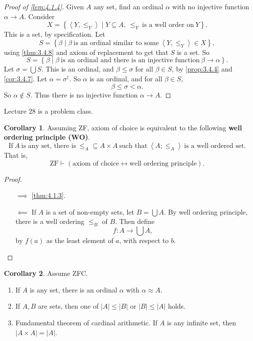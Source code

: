 \documentclass{article}
\newcommand{\rb}[1]{\left( #1 \right)}
\newcommand{\cb}[1]{\left\{ #1 \right\}}
\newcommand{\ab}[1]{\left\langle #1 \right\rangle}
\newcommand{\abs}[1]{\left\lvert #1 \right\rvert}
\newcommand{\iffb}[2]{\rb{#1 \leftrightarrow #2}}
\theoremstyle{definition}\newtheorem{definition}{Definition}[subsection]
\theoremstyle{definition}\newtheorem{remark1}[definition]{Remark}
\theoremstyle{definition}\newtheorem{example1}[definition]{Example}
\theoremstyle{definition}\newtheorem*{remark2}{Remark}
\theoremstyle{definition}\newtheorem*{example2}{Example}
\theoremstyle{definition}\newtheorem*{note}{Note}
\theoremstyle{definition}\newtheorem*{notation}{Notation}
\newtheorem{corollary}[definition]{Corollary}
\begin{document}
\begin{proof}[Proof of \ref{lem:4.1.4}]
Given $ A $ any set, find an ordinal $ \alpha $ with no injective function $ \alpha \to A $. Consider
$$ X = \cb{\ab{Y, \le_Y} \mid Y \subseteq A, \ \le_Y \ \text{is a well order on} \ Y}. $$
This is a set, by specification. Let
$$ S = \cb{\beta \mid \beta \ \text{is an ordinal similar to some} \ \ab{Y, \le_Y} \in X}, $$
using \ref{thm:3.4.8} and axiom of replacement to get that $ S $ is a set. So
$$ S = \cb{\beta \mid \beta \ \text{is an ordinal and there is an injective function} \ \beta \to \alpha}. $$
Let $ \sigma = \bigcup S $. This is an ordinal, and $ \beta \le \sigma $ for all $ \beta \in S $, by \ref{prop:3.4.4} and \ref{cor:3.4.7}. Let $ \alpha = \sigma^\dagger $. So $ \alpha $ is an ordinal, and for all $ \beta \in S $,
$$ \beta \le \sigma < \alpha. $$
So $ \alpha \notin S $. Thus there is no injective function $ \alpha \to A $.
\end{proof}


Lecture 28 is a problem class.


\begin{corollary}
Assuming ZF, axiom of choice is equivalent to the following \textbf{well ordering principle (WO)}.
$$ \text{If} \ A \ \text{is any set, there is} \ \le_A \subseteq A \times A \ \text{such that} \ \ab{A; \le_A} \ \text{is a well ordered set}. $$
That is,
$$ \text{ZF} \vdash \iffb{\text{axiom of choice}}{\text{well ordering principle}}. $$
\end{corollary}

\begin{proof}
\hfill
\begin{itemize}
\item[$ \implies $] \ref{thm:4.1.3}.
\item[$ \impliedby $] If $ A $ is a set of non-empty sets, let $ B = \bigcup A $. By well ordering principle, there is a well ordering $ \le_B $ of $ B $. Then define
$$ f : A \to \bigcup A, $$
by $ f\rb{a} $ as the least element of $ a $, with respect to $ b $.
\end{itemize}
\end{proof}

\begin{corollary}
\label{cor:4.1.6}
Assume ZFC.
\begin{enumerate}
\item If $ A $ is any set, there is an ordinal $ \alpha $ with $ \alpha \approx A $.
\item If $ A, B $ are sets, then one of $ \abs{A} \le \abs{B} $ or $ \abs{B} \le \abs{A} $ holds.
\item Fundamental theorem of cardinal arithmetic. If $ A $ is any infinite set, then $ \abs{A \times A} = \abs{A} $.
\end{enumerate}
\end{corollary}
\end{document}
